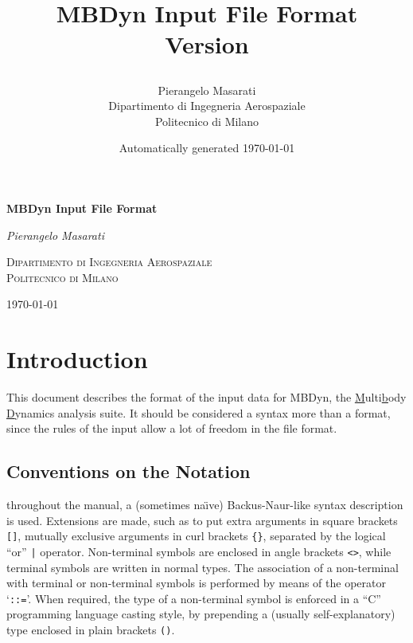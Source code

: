 \documentclass[10pt,dvips]{report}
\newcommand{\kw}[1]{\texttt{#1}}
\begin{document}
\begin{latexonly}
\title{\bf MBDyn Input File Format \\
Version

}
\author{Pierangelo Masarati \vspace{5mm}\\
    \sc Dipartimento di Ingegneria Aerospaziale \\
    \sc Politecnico di Milano}
\date{Automatically generated \today}
\maketitle
\end{latexonly}

\begin{htmlonly}
\begin{center}
\textbf{\LARGE MBDyn Input File Format}

\emph{\large Pierangelo Masarati}

\textsc{Dipartimento di Ingegneria Aerospaziale \\ Politecnico di Milano}

\today
\end{center}
\end{htmlonly}

\tableofcontents
\newpage
\listoffigures
\newpage
\listoftables
\newpage

\chapter*{Introduction}
This document describes the format of the input data for MBDyn,
the \underline{M}ulti\underline{b}ody \underline{D}ynamics analysis suite.
It should be considered a syntax more than a format, since the rules of the
input allow a lot of freedom in the file format. 

\section*{Conventions on the Notation}
throughout the manual, a (sometimes na\"{\i}ve) 
Backus-Naur-like syntax description is used. 
Extensions are made, such as to put extra arguments in square brackets
\kw{[]}, mutually exclusive arguments in curl brackets \kw{\{\}},
separated by the logical ``or'' \kw{|} operator.
Non-terminal symbols are enclosed in angle brackets \kw{<>}, while
terminal symbols are written in normal types.
The association of a non-terminal with terminal or non-terminal
symbols is performed by means of the operator `\kw{::=}'. 
When required, the type of a non-terminal symbol is enforced in a ``C''
programming language casting style, by prepending a (usually
self-explanatory) type enclosed in plain brackets \kw{()}.
\end{document}
